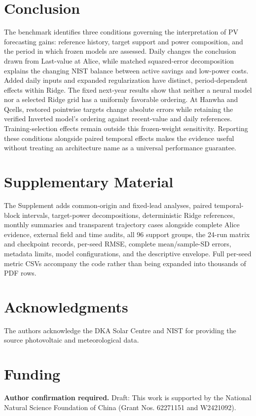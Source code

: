 \documentclass[aip,reprint,floatfix,amsmath,amssymb]{revtex4-2}
\begin{document}
\section{Conclusion}
The benchmark identifies three conditions governing the interpretation of PV forecasting gains: reference history, target support and power composition, and the period in which frozen models are assessed. Daily changes the conclusion drawn from Last-value at Alice, while matched squared-error decomposition explains the changing NIST balance between active savings and low-power costs. Added daily inputs and expanded regularization have distinct, period-dependent effects within Ridge. The fixed next-year results show that neither a neural model nor a selected Ridge grid has a uniformly favorable ordering. At Hanwha and Qcells, restored pointwise targets change absolute errors while retaining the verified Inverted model's ordering against recent-value and daily references. Training-selection effects remain outside this frozen-weight sensitivity. Reporting these conditions alongside paired temporal effects makes the evidence useful without treating an architecture name as a universal performance guarantee.
\section*{Supplementary Material}
The Supplement adds common-origin and fixed-lead analyses, paired temporal-block intervals, target-power decompositions, deterministic Ridge references, monthly summaries and transparent trajectory cases alongside complete Alice evidence, external field and time audits, all 96 support groups, the 24-run matrix and checkpoint records, per-seed RMSE, complete mean/sample-SD errors, metadata limits, model configurations, and the descriptive envelope. Full per-seed metric CSVs accompany the code rather than being expanded into thousands of PDF rows.

\section*{Acknowledgments}
The authors acknowledge the DKA Solar Centre and NIST for providing the source photovoltaic and meteorological data.
\section*{Funding}
\textbf{Author confirmation required.} Draft: This work is supported by the National Natural Science Foundation of China (Grant Nos. 62271151 and W2421092).
\end{document}
